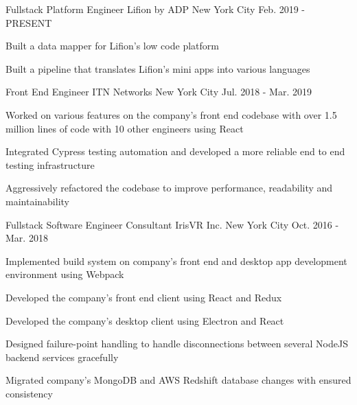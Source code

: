 

\begin{cventries}

  \cventry
    {Fullstack Platform Engineer} %
    {Lifion by ADP} %
    {New York City} %
    {Feb. 2019 - PRESENT} %
    {
      \begin{cvitems} %
        \item {Built a data mapper for Lifion's low code platform}
        \item {Built a pipeline that translates Lifion's mini apps into various languages}
      \end{cvitems}
    }

  \cventry
    {Front End Engineer} %
    {ITN Networks} %
    {New York City} %
    {Jul. 2018 - Mar. 2019} %
    {
      \begin{cvitems} %
        \item {Worked on various features on the company's front end codebase with over 1.5 million lines of code with 10 other engineers using React}
        \item {Integrated Cypress testing automation and developed a more reliable end to end testing infrastructure} 
        \item {Aggressively refactored the codebase to improve performance, readability and maintainability} 
      \end{cvitems}
    }

  \cventry
    {Fullstack Software Engineer Consultant} %
    {IrisVR Inc.} %
    {New York City} %
    {Oct. 2016 - Mar. 2018} %
    {
      \begin{cvitems} %
        \item {Implemented build system on company's front end and desktop app development environment using Webpack}
        \item {Developed the company's front end client using React and Redux}
        \item {Developed the company's desktop client using Electron and React}
        \item {Designed failure-point handling to handle disconnections between several NodeJS backend services gracefully}
        \item {Migrated company's MongoDB and AWS Redshift database changes with ensured consistency}
      \end{cvitems}
    }


\end{cventries}
